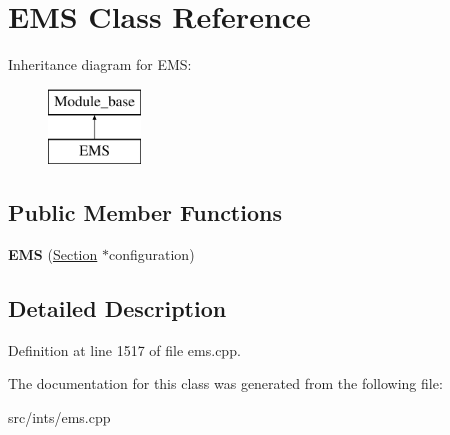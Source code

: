\hypertarget{classEMS}{\section{E\-M\-S Class Reference}
\label{classEMS}
}
Inheritance diagram for E\-M\-S\-:\begin{figure}[H]
\begin{center}
\leavevmode
\includegraphics[height=2.000000cm]{classEMS}
\end{center}
\end{figure}
\subsection*{Public Member Functions}
\begin{DoxyCompactItemize}
\item 
\hypertarget{classEMS_a580595567b3555bb47ee6d0eb1187815}{{\bfseries E\-M\-S} (\hyperlink{classSection}{Section} $\ast$configuration)}\label{classEMS_a580595567b3555bb47ee6d0eb1187815}

\end{DoxyCompactItemize}


\subsection{Detailed Description}


Definition at line 1517 of file ems.\-cpp.



The documentation for this class was generated from the following file\-:\begin{DoxyCompactItemize}
\item 
src/ints/ems.\-cpp\end{DoxyCompactItemize}
